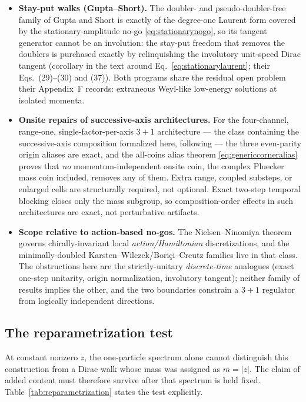 \documentclass[11pt]{article}
\begin{document}
\begin{itemize}[leftmargin=2em]
  \item \textbf{Stay-put walks (Gupta--Short).}  The doubler- and
  pseudo-doubler-free family of Gupta and Short
  \cite{GuptaShortDoubling} is exactly of the degree-one Laurent form
  covered by the stationary-amplitude no-go
  \eqref{eq:stationarynogo}, so its tangent generator cannot be an
  involution: the stay-put freedom that removes the doublers is
  purchased exactly by relinquishing the involutory unit-speed Dirac
  tangent (corollary in the text around
  Eq.~\eqref{eq:stationarylaurent}; their Eqs.~(29)--(30) and (37)).
  Both programs share the residual open problem their Appendix~F
  records: extraneous Weyl-like low-energy solutions at isolated
  momenta.
  \item \textbf{Onsite repairs of successive-axis architectures.}  For
  the four-channel, range-one, single-factor-per-axis $3+1$
  architecture --- the class containing the successive-axis composition
  formalized here, following \cite{MlodinowBrun} --- the three
  even-parity origin aliases are exact, and the all-coins alias theorem
  \eqref{eq:genericcorneralias} proves that \emph{no} momentum-independent
  onsite coin, the complex Pluecker mass coin included, removes any of
  them.  Extra range, coupled substeps, or enlarged cells are
  structurally required, not optional.  Exact two-step temporal
  blocking closes only the mass subgroup, so composition-order effects
  in such architectures are exact, not perturbative artifacts.
  \item \textbf{Scope relative to action-based no-gos.}  The
  Nielsen--Ninomiya theorem \cite{NielsenNinomiya} governs
  chirally-invariant local \emph{action/Hamiltonian} discretizations,
  and the minimally-doubled Karsten--Wilczek/Bori\c{c}i--Creutz families
  live in that class.  The obstructions here are the strictly-unitary
  \emph{discrete-time} analogues (exact one-step unitarity, origin
  normalization, involutory tangent); neither family of results implies
  the other, and the two boundaries constrain a $3+1$ regulator from
  logically independent directions.
\end{itemize}

\subsection*{The reparametrization test}

At constant nonzero $z$, the one-particle spectrum alone cannot distinguish
this construction from a Dirac walk whose mass was assigned as $m=|z|$.  The
claim of added content must therefore survive after that spectrum is held
fixed.  Table~\ref{tab:reparametrization} states the test explicitly.
\end{document}
